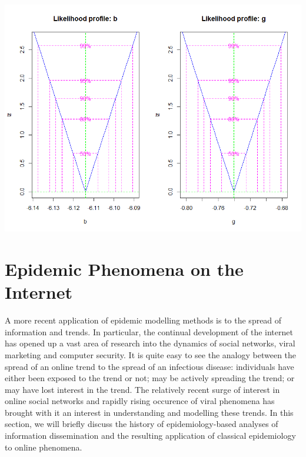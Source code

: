 \documentclass[11pt, a4paper, oneside,titlepage]{article}
\begin{document}
\begin{framed}
{\begin{center} \includegraphics[width=140mm]{mle.png}\end{center}}

\end{framed}

\section*{Epidemic Phenomena on the Internet}
A more recent application of epidemic modelling methods is to the spread of information and trends. In particular, the continual development of the internet has opened up a vast area of research into the dynamics of social networks, viral marketing and computer security. It is quite easy to see the analogy between the spread of an online trend to the spread of an infectious disease: individuals have either been exposed to the trend or not; may be actively spreading the trend; or may have lost interest in the trend. The relatively recent surge of interest in online social networks and rapidly rising occurence of viral phenomena has brought with it an interest in understanding and modelling these trends. In this section, we will briefly discuss the history of epidemiology-based analyses of information dissemination and the resulting application of classical epidemiology to online phenomena.
\end{document}
